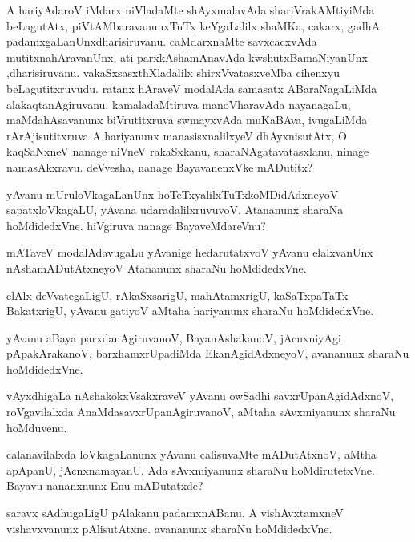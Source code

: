 \documentclass{article}
\begin{document}
\begin{mn}
A hariyAdaroV iMdarx niVladaMte shAyxmalavAda shariVrakAMtiyiMda beLagutAtx, 
piVtAMbaravanunxTuTx keYgaLalilx shaMKa, cakarx, gadhA padamxgaLanUnxdharisiruvanu.  
caMdarxnaMte  savxcacxvAda mutitxnahAravanUnx,  ati parxkAshamAnavAda  
kwshutxBamaNiyanUnx   ,dharisiruvanu.  vakaSxsasxthXladalilx  shirxVvatasxveMba 
cihenxyu beLagutitxruvudu.  ratanx hAraveV modalAda samasatx ABaraNagaLiMda 
alakaqtanAgiruvanu. kamaladaMtiruva manoVharavAda nayanagaLu, maMdahAsavanunx 
biVrutitxruva swmayxvAda muKaBAva, ivugaLiMda rArAjisutitxruva A hariyanunx 
manasisxnalilxyeV dhAyxnisutAtx, O kaqSaNxneV nanage niVneV rakaSxkanu, 
sharaNAgatavatasxlanu, ninage namasAkxravu. deVvesha, nanage BayavanenxVke mADutitx?
\end{mn}

\begin{mn}
yAvanu  mUruloVkagaLanUnx  hoTeTxyalilxTuTxkoMDidAdxneyoV sapatxloVkagaLU, yAvana
 udaradalilxruvuvoV,  Atananunx sharaNa hoMdidedxVne. hiVgiruva nanage BayaveMdareVnu?
\end{mn}

\begin{mn}
mATaveV modalAdavugaLu yAvanige hedarutatxvoV yAvanu elalxvanUnx 
nAshamADutAtxneyoV  Atananunx sharaNu hoMdidedxVne.
\end{mn}

\begin{mn}
elAlx deVvategaLigU,  rAkaSxsarigU,  mahAtamxrigU,  kaSaTxpaTaTx BakatxrigU, 
yAvanu gatiyoV aMtaha hariyanunx sharaNu hoMdidedxVne.
\end{mn}

\begin{mn}
yAvanu  aBaya parxdanAgiruvanoV,  BayanAshakanoV, jAcnxniyAgi pApakArakanoV, 
barxhamxrUpadiMda EkanAgidAdxneyoV, avananunx sharaNu hoMdidedxVne. 
\end{mn}

\begin{mn}
vAyxdhigaLa nAshakokxVsakxraveV yAvanu owSadhi savxrUpanAgidAdxnoV, roVgavilalxda 
AnaMdasavxrUpanAgiruvanoV,  aMtaha  sAvxmiyanunx  sharaNu hoMduvenu.
\end{mn}

\begin{mn}
calanavilalxda loVkagaLanunx yAvanu calisuvaMte mADutAtxnoV,  aMtha  apApanU,  
jAcnxnamayanU,  Ada sAvxmiyanunx sharaNu hoMdirutetxVne.  Bayavu nananxnunx Enu mADutatxde?
\end{mn}

\begin{mn}
saravx sAdhugaLigU pAlakanu padamxnABanu. A vishAvxtamxneV vishavxvanunx 
pAlisutAtxne. avananunx sharaNu hoMdidedxVne.
\end{mn}
\end{document}

